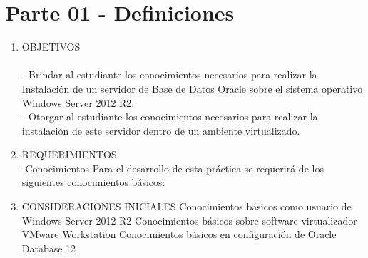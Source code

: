 \section{Parte 01 - Definiciones} 

\begin{enumerate}[1.]
	\item OBJETIVOS
	\\\\- Brindar al estudiante los conocimientos necesarios para realizar la Instalación de un servidor de Base de Datos Oracle sobre el sistema operativo Windows Server 2012 R2.
	\\- Otorgar al estudiante los conocimientos necesarios para realizar la instalación de este servidor dentro de un ambiente virtualizado.\\
	\item REQUERIMIENTOS
	\\-Conocimientos
	\subitem Para el desarrollo de esta práctica se requerirá de los siguientes conocimientos básicos:

	\item CONSIDERACIONES INICIALES
	\subitem Conocimientos b\'asicos como usuario de Windows Server 2012 R2
	\subitem Conocimientos b\'asicos sobre software virtualizador VMware Workstation
	\subitem Conocimientos b\'asicos en configuración de Oracle Database 12

\end{enumerate} 
